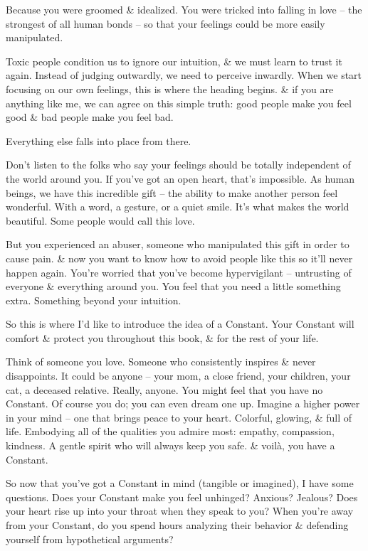 \documentclass{article}
\numberwithin{equation}{section}
\begin{document}
Because you were groomed \& idealized. You were tricked into falling in love -- the strongest of all human bonds -- so that your feelings could be more easily manipulated.

Toxic people condition us to ignore our intuition, \& we must learn to trust it again. Instead of judging outwardly, we need to perceive inwardly. When we start focusing on our own feelings, this is where the heading begins. \& if you are anything like me, we can agree on this simple truth: good people make you feel good \& bad people make you feel bad.

Everything else falls into place from there.

Don't listen to the folks who say your feelings should be totally independent of the world around you. If you've got an open heart, that's impossible. As human beings, we have this incredible gift -- the ability to make another person feel wonderful. With a word, a gesture, or a quiet smile. It's what makes the world beautiful. Some people would call this love.

But you experienced an abuser, someone who manipulated this gift in order to cause pain. \& now you want to know how to avoid people like this so it'll never happen again. You're worried that you've become hypervigilant -- untrusting of everyone \& everything around you. You feel that you need a little something extra. Something beyond your intuition.

So this is where I'd like to introduce the idea of a Constant. Your Constant will comfort \& protect you throughout this book, \& for the rest of your life.

Think of someone you love. Someone who consistently inspires \& never disappoints. It could be anyone -- your mom, a close friend, your children, your cat, a deceased relative. Really, anyone. You might feel that you have no Constant. Of course you do; you can even dream one up. Imagine a higher power in your mind -- one that brings peace to your heart. Colorful, glowing, \& full of life. Embodying all of the qualities you admire most: empathy, compassion, kindness. A gentle spirit who will always keep you safe. \& voil\`a, you have a Constant.

So now that you've got a Constant in mind (tangible or imagined), I have some questions. Does your Constant make you feel unhinged? Anxious? Jealous? Does your heart rise up into your throat when they speak to  you? When you're away from your Constant, do you spend hours analyzing their behavior \& defending yourself from hypothetical arguments?
\end{document}
